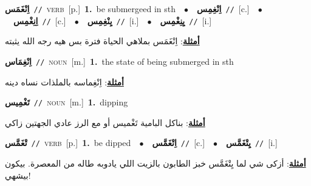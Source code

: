 \documentclass[10pt,a4paper,twoside]{article} %
\begin{document}
\begin{multicols}{2}
{\setlength\topsep{0pt}\textbf{\foreignlanguage{arabic}{اِنْغَمَس}}\ {\color{gray}\texttt{//}\color{black}}\ \textsc{verb}\ [p.]\ \textbf{1.}~be submergeed in sth\ \ $\bullet$\ \ \setlength\topsep{0pt}\textbf{\foreignlanguage{arabic}{اِنْغِمِس}}\ {\color{gray}\texttt{//}\color{black}}\ [c.]\ \ $\bullet$\ \ \setlength\topsep{0pt}\textbf{\foreignlanguage{arabic}{اِنِغْمِس}}\ {\color{gray}\texttt{//}\color{black}}\ [c.]\ \ $\bullet$\ \ \setlength\topsep{0pt}\textbf{\foreignlanguage{arabic}{يِنْغِمِس}}\ {\color{gray}\texttt{//}\color{black}}\ [i.]\ \ $\bullet$\ \ \setlength\topsep{0pt}\textbf{\foreignlanguage{arabic}{يِنِغْمِس}}\ {\color{gray}\texttt{//}\color{black}}\ [i.]\  \begin{flushright}\color{gray}\foreignlanguage{arabic}{\textbf{\underline{\foreignlanguage{arabic}{أمثلة}}}: اِنْغَمَس بملاهي الحياة فترة بس هيه رجه الله يثبته}\end{flushright}\color{black}} \vspace{2mm}

{\setlength\topsep{0pt}\textbf{\foreignlanguage{arabic}{اِنْغِمَاس}}\ {\color{gray}\texttt{//}\color{black}}\ \textsc{noun}\ [m.]\ \textbf{1.}~the state of being submerged in sth\  \begin{flushright}\color{gray}\foreignlanguage{arabic}{\textbf{\underline{\foreignlanguage{arabic}{أمثلة}}}: اِنْغِماسه بالملذات نساه دينه}\end{flushright}\color{black}} \vspace{2mm}

{\setlength\topsep{0pt}\textbf{\foreignlanguage{arabic}{تَغْمِيس}}\ {\color{gray}\texttt{//}\color{black}}\ \textsc{noun}\ [m.]\ \textbf{1.}~dipping\  \begin{flushright}\color{gray}\foreignlanguage{arabic}{\textbf{\underline{\foreignlanguage{arabic}{أمثلة}}}: بناكل البامية تَغْميس أو مع الرز عادي الجهتين زاكي}\end{flushright}\color{black}} \vspace{2mm}

{\setlength\topsep{0pt}\textbf{\foreignlanguage{arabic}{تْغَمَّس}}\ {\color{gray}\texttt{//}\color{black}}\ \textsc{verb}\ [p.]\ \textbf{1.}~be dipped\ \ $\bullet$\ \ \setlength\topsep{0pt}\textbf{\foreignlanguage{arabic}{اِتْغَمَّس}}\ {\color{gray}\texttt{//}\color{black}}\ [c.]\ \ $\bullet$\ \ \setlength\topsep{0pt}\textbf{\foreignlanguage{arabic}{يِتْغَمَّس}}\ {\color{gray}\texttt{//}\color{black}}\ [i.]\  \begin{flushright}\color{gray}\foreignlanguage{arabic}{\textbf{\underline{\foreignlanguage{arabic}{أمثلة}}}: أزكى شي لما يِتْغَمَّس خبز الطابون بالزيت اللي يادوبه طاله من المعصرة. بيكون بيشهي!}\end{flushright}\color{black}} \vspace{2mm}


\end{multicols}
\end{document}
